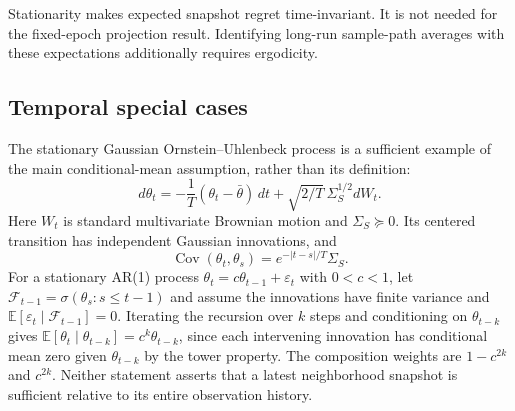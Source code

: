 Stationarity makes expected snapshot regret time-invariant. It is not needed
for the fixed-epoch projection result. Identifying long-run sample-path
averages with these expectations additionally requires ergodicity.

\subsection{Temporal special cases}
\label{app:temporal-special-cases}
The stationary Gaussian Ornstein--Uhlenbeck process is a sufficient example
of the main conditional-mean assumption, rather than its definition:
\begin{equation}
d\theta_t=-\frac1T(\theta_t-\bar\theta)\,dt
+\sqrt{2/T}\,\Sigma_S^{1/2}dW_t.
\label{eq:OU_process}
\end{equation}
Here $W_t$ is standard multivariate Brownian motion and $\Sigma_S\succeq0$.
Its centered transition has independent Gaussian innovations, and
\begin{equation}
\operatorname{Cov}(\theta_t,\theta_s)=e^{-|t-s|/T}\Sigma_S.
\label{eq:separable_space_time_covariance}
\end{equation}
For a stationary AR(1) process $\theta_t=c\theta_{t-1}+\varepsilon_t$
with $0<c<1$, let $\mathcal F_{t-1}=\sigma(\theta_s:s\le t-1)$ and
assume the innovations have finite variance and
$\mathbb E[\varepsilon_t\mid\mathcal F_{t-1}]=0$. Iterating the recursion
over $k$ steps and conditioning on $\theta_{t-k}$ gives
$\mathbb E[\theta_t\mid\theta_{t-k}]=c^k\theta_{t-k}$, since each intervening
innovation has conditional mean zero given $\theta_{t-k}$ by the tower
property. The composition weights are $1-c^{2k}$ and $c^{2k}$.
Neither statement asserts that a latest neighborhood snapshot is sufficient
relative to its entire observation history.

